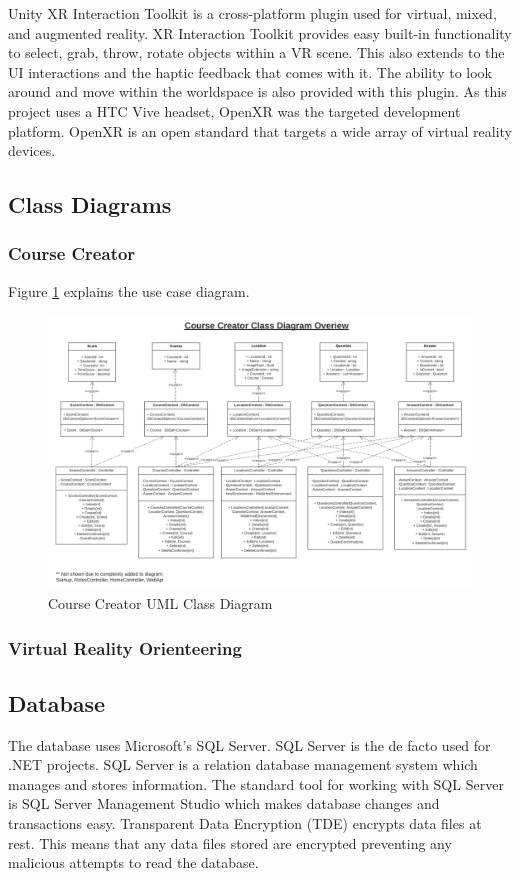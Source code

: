 Unity XR Interaction Toolkit is a cross-platform plugin used for virtual, mixed, and augmented reality. XR Interaction Toolkit provides easy built-in functionality to select, grab, throw, rotate objects within a VR scene. This also extends to the UI interactions and the haptic feedback that comes with it. The ability to look around and move within the worldspace is also provided with this plugin. As this project uses a HTC Vive headset, OpenXR was the targeted development platform. OpenXR is an open standard that targets a wide array of virtual reality devices.

\subsection{Class Diagrams}

\subsubsection{Course Creator}

Figure \ref{Course Creator UML Class Diagram} explains the use case diagram.

\begin{figure}[htb]
	\centering
	\includegraphics[width=.9\textwidth]{Requirements/assets/course-creator-class-diagram.png}
	\caption[Course Creator UML Class Diagram]{\label{Course Creator UML Class Diagram}Course Creator UML Class Diagram}
\end{figure}

\subsubsection{Virtual Reality Orienteering}

\subsection{Database}
The database uses Microsoft's SQL Server. SQL Server is the de facto used for .NET projects.  SQL Server is a relation database management system which manages and stores information. The standard tool for working with SQL Server is SQL Server Management Studio which makes database changes and transactions easy. Transparent Data Encryption (TDE) encrypts data files at rest. This means that any data files stored are encrypted preventing any malicious attempts to read the database.

